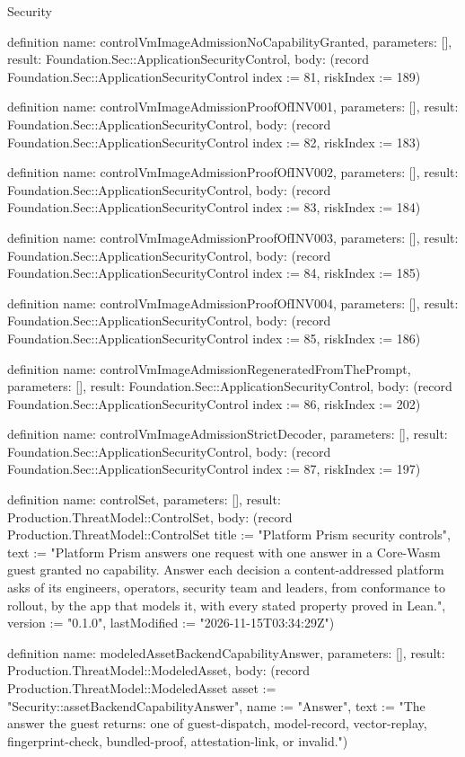 \begin{lexlean}{Security}
\begin{semanticmodule}
definition{
  name: controlVmImageAdmissionNoCapabilityGranted,
  parameters: [],
  result: Foundation.Sec::ApplicationSecurityControl,
  body: (record Foundation.Sec::ApplicationSecurityControl {index := 81, riskIndex := 189})
}

definition{
  name: controlVmImageAdmissionProofOfINV001,
  parameters: [],
  result: Foundation.Sec::ApplicationSecurityControl,
  body: (record Foundation.Sec::ApplicationSecurityControl {index := 82, riskIndex := 183})
}

definition{
  name: controlVmImageAdmissionProofOfINV002,
  parameters: [],
  result: Foundation.Sec::ApplicationSecurityControl,
  body: (record Foundation.Sec::ApplicationSecurityControl {index := 83, riskIndex := 184})
}

definition{
  name: controlVmImageAdmissionProofOfINV003,
  parameters: [],
  result: Foundation.Sec::ApplicationSecurityControl,
  body: (record Foundation.Sec::ApplicationSecurityControl {index := 84, riskIndex := 185})
}

definition{
  name: controlVmImageAdmissionProofOfINV004,
  parameters: [],
  result: Foundation.Sec::ApplicationSecurityControl,
  body: (record Foundation.Sec::ApplicationSecurityControl {index := 85, riskIndex := 186})
}

definition{
  name: controlVmImageAdmissionRegeneratedFromThePrompt,
  parameters: [],
  result: Foundation.Sec::ApplicationSecurityControl,
  body: (record Foundation.Sec::ApplicationSecurityControl {index := 86, riskIndex := 202})
}

definition{
  name: controlVmImageAdmissionStrictDecoder,
  parameters: [],
  result: Foundation.Sec::ApplicationSecurityControl,
  body: (record Foundation.Sec::ApplicationSecurityControl {index := 87, riskIndex := 197})
}

definition{
  name: controlSet,
  parameters: [],
  result: Production.ThreatModel::ControlSet,
  body: (record Production.ThreatModel::ControlSet {title := "Platform Prism security controls", text := "Platform Prism answers one request with one answer in a Core-Wasm guest granted no capability. Answer each decision a content-addressed platform asks of its engineers, operators, security team and leaders, from conformance to rollout, by the app that models it, with every stated property proved in Lean.", version := "0.1.0", lastModified := "2026-11-15T03:34:29Z"})
}

definition{
  name: modeledAssetBackendCapabilityAnswer,
  parameters: [],
  result: Production.ThreatModel::ModeledAsset,
  body: (record Production.ThreatModel::ModeledAsset {asset := "Security::assetBackendCapabilityAnswer", name := "Answer", text := "The answer the guest returns: one of guest-dispatch, model-record, vector-replay, fingerprint-check, bundled-proof, attestation-link, or invalid."})
}


\end{semanticmodule}
\end{lexlean}
